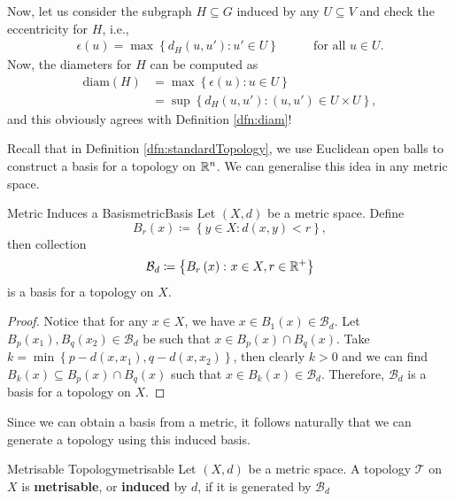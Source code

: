 \documentclass[math]{amznotes}
\theoremstyle{remark}
\begin{document}
Now, let us consider the subgraph $H \subseteq G$ induced by any $U \subseteq V$ and check the eccentricity for $H$, i.e.,
\begin{align*}
    \epsilon\left(u\right) = \max\left\{d_H\left(u, u'\right) \colon u' \in U\right\} & \qquad\textrm{for all } u \in U.
\end{align*}
Now, the diameters for $H$ can be computed as 
\begin{align*}
    \mathrm{diam}\left(H\right) & = \max\left\{\epsilon\left(u\right) \colon u \in U\right\} \\
    & = \sup\left\{d_H\left(u, u'\right) \colon \left(u, u'\right) \in U \times U\right\},
\end{align*}
and this obviously agrees with Definition \ref{dfn:diam}!

Recall that in Definition \ref{dfn:standardTopology}, we use Euclidean open balls to construct a basis for a topology on $\mathbb{R}^n$. We can generalise this idea in any metric space.
\begin{probox}{Metric Induces a Basis}{metricBasis}
    Let $\left(X, d\right)$ be a metric space. Define 
    \begin{equation*}
        B_r\left(x\right) \coloneqq \left\{y \in X \colon d\left(x, y\right) < r\right\},
    \end{equation*}
    then collection
    \begin{equation*}
        \mathcal{B}_d \coloneqq \left\{B_r\left(x\right) \colon x \in X, r \in \mathbb{R}^+\right\}
    \end{equation*}
    is a basis for a topology on $X$.
    \tcblower
    \begin{proof}
        Notice that for any $x \in X$, we have $x \in B_1\left(x\right) \in \mathcal{B}_d$. Let $B_p\left(x_1\right), B_q\left(x_2\right) \in \mathcal{B}_d$ be such that $x \in B_p\left(x\right) \cap B_q\left(x\right)$. Take $k = \min\left\{p - d\left(x, x_1\right), q - d\left(x, x_2\right)\right\}$, then clearly $k > 0$ and we can find $B_k\left(x\right) \subseteq B_p\left(x\right) \cap B_q\left(x\right)$ such that $x \in B_k\left(x\right) \in \mathcal{B}_d$. Therefore, $\mathcal{B}_d$ is a basis for a topology on $X$.
    \end{proof}
\end{probox}
Since we can obtain a basis from a metric, it follows naturally that we can generate a topology using this induced basis.
\begin{dfnbox}{Metrisable Topology}{metrisable}
    Let $\left(X, d\right)$ be a metric space. A topology $\mathcal{T}$ on $X$ is {\color{red} \textbf{metrisable}}, or {\color{red} \textbf{induced}} by $d$, if it is generated by $\mathcal{B}_d$
\end{dfnbox}
\end{document}
